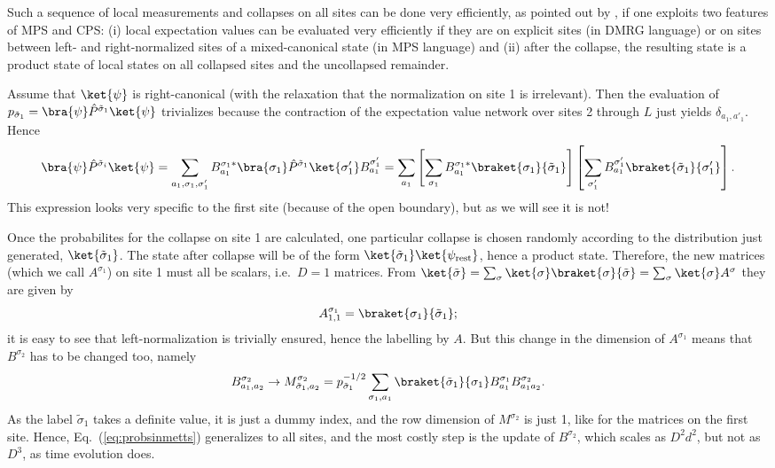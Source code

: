 Such a sequence of local measurements and collapses on all sites can be done very efficiently, as pointed out by \cite{Stoudenmire10}, if one exploits two features of MPS and CPS: (i) local expectation values can be evaluated very efficiently if they are on explicit sites (in DMRG language) or on sites between left- and right-normalized sites of a mixed-canonical state (in MPS language) and (ii) after the collapse, the resulting state is a product state of local states on all collapsed sites and the uncollapsed remainder.  

Assume that $\ket{\psi}$ is right-canonical (with the relaxation that the normalization on site 1 is irrelevant). Then the evaluation of $p_{\tilde{\sigma}_1} =\bra{\psi} \hat{P}^{\tilde{\sigma}_1} \ket{\psi}$ trivializes because the contraction of the expectation value network over sites 2 through $L$ just yields $\delta_{a_1,a'_1}$. Hence
\begin{equation}
\bra{\psi} \hat{P}^{\tilde{\sigma}_i} \ket{\psi} = \sum_{a_1,\sigma_1,\sigma'_1} B^{\sigma_1 *}_{a_1} \bra{\sigma_1} \hat{P}^{\tilde{\sigma}_1} \ket{\sigma'_1} B^{\sigma'_1}_{a_1} = 
\sum_{a_1} \left[ \sum_{\sigma_1} B^{\sigma_1*}_{a_1} \braket{\sigma_1}{\tilde{\sigma}_1} \right]
\left[ \sum_{\sigma'_1} B^{\sigma'_1}_{a_1} \braket{\tilde{\sigma}_1}{\sigma'_1} \right] .
\label{eq:probsinmetts}
\end{equation}
This expression looks very specific to the first site (because of the open boundary), but as we will see it is not! 

Once the probabilites for the collapse on site 1 are calculated, one particular collapse is chosen randomly according to the distribution just generated, $\ket{\tilde{\sigma}_1}$. The state after collapse will be of the form $\ket{\tilde{\sigma}_1} \ket{\psi_{{\rm rest}}}$, hence a product state. Therefore, the new matrices (which we call $A^{\sigma_1}$) on site 1 must all be scalars, i.e.\ $D=1$ matrices. From
$\ket{\tilde{\sigma}} = \sum_{\sigma} \ket{\sigma} \braket{\sigma}{\tilde{\sigma}} = \sum_\sigma \ket{\sigma} A^{\sigma}$ they are given by
\begin{equation}
A^{\sigma_1}_{1,1} = \braket{\sigma_1}{\tilde{\sigma}_1} ;
\end{equation}
it is easy to see that left-normalization is trivially ensured, hence the labelling by $A$. But this change in the dimension of $A^{\sigma_1}$ means that $B^{\sigma_2}$ has to be changed too, namely
\begin{equation}
B^{\sigma_2}_{a_1,a_2} \rightarrow M^{\sigma_2}_{\tilde{\sigma}_1,a_2} =
p_{\tilde{\sigma}_1}^{-1/2} \sum_{\sigma_1,a_1} \braket{\tilde{\sigma}_1}{\sigma_1} B^{\sigma_1}_{a_1} B^{\sigma_2}_{a_1 a_2} .
\end{equation}
As the label $\tilde{\sigma}_1$ takes a definite value, it is just a dummy index, and the row dimension of $M^{\sigma_2}$ is just 1, like for the matrices on the first site. Hence, Eq.~(\ref{eq:probsinmetts}) generalizes to all sites, and the most costly step is the update of $B^{\sigma_2}$, which scales as $D^2 d^2$, but not as $D^3$, as time evolution does.


